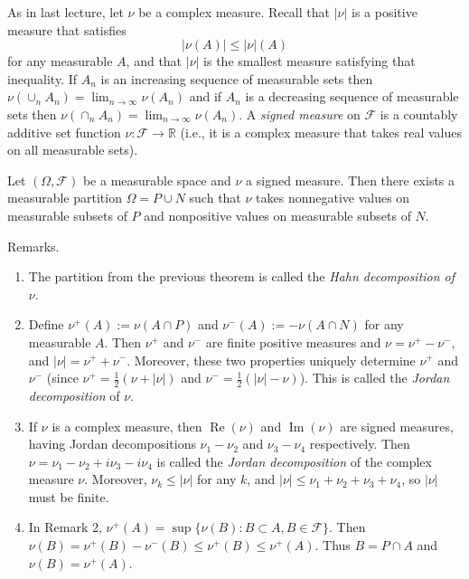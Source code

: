
As in last lecture, let $\nu$ be a complex measure.
Recall that $|\nu|$ is a positive measure that satisfies
$$|\nu(A)|\leq |\nu|(A)$$
for any measurable $A$, and that $|\nu|$ is the smallest measure satisfying that inequality.
If $A_n$ is an increasing sequence of measurable sets then
$\nu(\cup_n A_n)=\lim_{n\to\infty}\nu(A_n)$
and if $A_n$ is a decreasing sequence of measurable sets then
$\nu(\cap_n A_n)=\lim_{n\to\infty}\nu(A_n)$.
A \emph{signed measure} on $\mathcal{F}$ is a countably additive set function
$\nu:\mathcal{F}\to\mathbb{R}$ (i.e., it is a complex measure that takes real values on all measurable sets).

\begin{theorem}\label{decomp}
  Let $(\Omega,\mathcal{F})$ be a measurable space and $\nu$ a signed measure.
  Then there exists a measurable partition $\Omega=P\cup N$ such that
  $\nu$ takes nonnegative values on measurable subsets of $P$ and nonpositive values on
  measurable subsets of $N$.
\end{theorem}

Remarks.
\begin{enumerate}
  \item The partition from the previous theorem is called the \emph{Hahn decomposition of $\nu$}.
  \item Define $\nu^+(A):=\nu(A\cap P)$ and $\nu^-(A):=-\nu(A\cap N)$ for any measurable $A$.
  Then $\nu^+$ and $\nu^-$ are finite positive measures and $\nu=\nu^+-\nu^-$,
  and $|\nu|=\nu^++\nu^-$.
  Moreover, these two properties uniquely determine $\nu^+$ and $\nu^-$
  (since $\nu^+=\frac{1}{2}(\nu+|\nu|)$ and $\nu^-=\frac{1}{2}(|\nu|-\nu)$).
  This is called the \emph{Jordan decomposition} of $\nu$.
  \item If $\nu$ is a complex measure, then $\operatorname{Re}(\nu)$ and $\operatorname{Im}(\nu)$
  are signed measures, having Jordan decompositions $\nu_1-\nu_2$ and $\nu_3-\nu_4$ respectively.
  Then $\nu=\nu_1-\nu_2+i\nu_3-i\nu_4$ is called the \emph{Jordan decomposition} of the complex measure $\nu$.
  Moreover, $\nu_k\leq |\nu|$ for any $k$,
  and $|\nu|\leq \nu_1+\nu_2+\nu_3+\nu_4$,
  so $|\nu|$ must be finite.
  \item In Remark 2, $\nu^+(A)=\sup\{\nu(B):B\subset A,B\in\mathcal{F}\}$.
  Then $\nu(B)=\nu^+(B)-\nu^-(B)\leq \nu^+(B)\leq \nu^+(A)$.
  Thus $B=P\cap A$ and $\nu(B)=\nu^+(A)$.
\end{enumerate}

